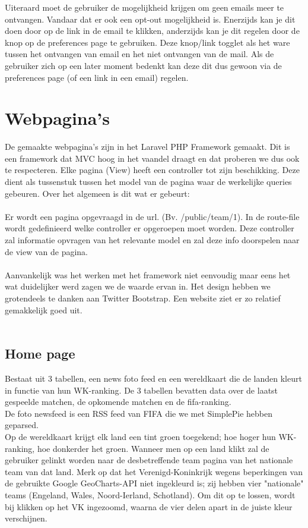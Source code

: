 \documentclass[11pt, a4paper]{article}
\begin{document}
Uiteraard moet de gebruiker de mogelijkheid krijgen om geen emails meer te ontvangen. Vandaar dat er ook een opt-out mogelijkheid is. Enerzijds kan je dit doen door op de link in de email te klikken,
anderzijds kan je dit regelen door de knop op de preferences page te gebruiken. Deze knop/link togglet als het ware tussen het ontvangen van email en het niet ontvangen van de mail. Als de gebruiker zich op een later moment
bedenkt kan deze dit dus gewoon via de preferences page (of een link in een email) regelen.
\section{Webpagina's}
De gemaakte webpagina's zijn in het Laravel PHP Framework gemaakt. Dit is een framework dat MVC hoog in het vaandel draagt en dat proberen we dus ook te respecteren.
Elke pagina (View) heeft een controller tot zijn beschikking. Deze dient als tussenstuk tussen het model van de pagina waar de werkelijke queries gebeuren. Over het algemeen is dit wat er gebeurt:
\\
\\
Er wordt een pagina opgevraagd in de url. (Bv. /public/team/1). In de route-file wordt gedefinieerd welke controller er opgeroepen moet worden. Deze controller zal informatie opvragen van het
relevante model en zal deze info doorspelen naar de view van de pagina.
\\
\\
Aanvankelijk was het werken met het framework niet eenvoudig maar eens het wat duidelijker werd zagen we de waarde ervan in.
Het design hebben we grotendeels te danken aan Twitter Bootstrap. Een website ziet er zo relatief gemakkelijk goed uit.
\\
\\
\subsection{Home page}
Bestaat uit 3 tabellen, een news foto feed en een wereldkaart die de landen kleurt in functie van hun WK-ranking.
De 3 tabellen bevatten data over de laatst gespeelde matchen, de opkomende matchen en de fifa-ranking.
\\
De foto newsfeed is een RSS feed van FIFA die we met SimplePie hebben geparsed.
\\
Op de wereldkaart krijgt elk land een tint groen toegekend; hoe hoger hun WK-ranking, hoe donkerder het groen. Wanneer men op een land klikt zal de gebruiker gelinkt worden naar de desbetreffende team pagina van het nationale team van dat land. Merk op dat het Verenigd-Koninkrijk wegens beperkingen van de gebruikte Google GeoCharts-API niet ingekleurd is; zij hebben vier "nationale" teams (Engeland, Wales, Noord-Ierland, Schotland). Om dit op te lossen, wordt bij klikken op het VK ingezoomd, waarna de vier delen apart in de juiste kleur verschijnen.
\end{document}
